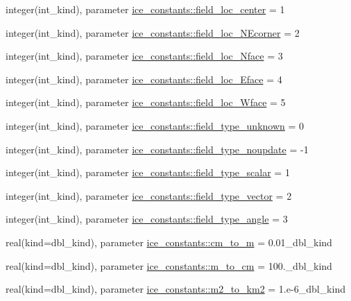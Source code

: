 \begin{DoxyCompactItemize}
\item 
integer(int\_\-kind), parameter \hyperlink{namespaceice__constants_a4c526a105da0fa08ad1877e55f6d60fc}{ice\_\-constants::field\_\-loc\_\-center} = 1
\item 
integer(int\_\-kind), parameter \hyperlink{namespaceice__constants_a6b38e42de787f72eabe064f976338775}{ice\_\-constants::field\_\-loc\_\-NEcorner} = 2
\item 
integer(int\_\-kind), parameter \hyperlink{namespaceice__constants_ac47ad33ed33a4dae49cf6e50c05efd06}{ice\_\-constants::field\_\-loc\_\-Nface} = 3
\item 
integer(int\_\-kind), parameter \hyperlink{namespaceice__constants_a542746cf70d3c18a41d44c5382c4cb34}{ice\_\-constants::field\_\-loc\_\-Eface} = 4
\item 
integer(int\_\-kind), parameter \hyperlink{namespaceice__constants_ad97a4cfce80f3acb3657f497e459e6fb}{ice\_\-constants::field\_\-loc\_\-Wface} = 5
\item 
integer(int\_\-kind), parameter \hyperlink{namespaceice__constants_ab690b4d66447609212d302c0fe485dda}{ice\_\-constants::field\_\-type\_\-unknown} = 0
\item 
integer(int\_\-kind), parameter \hyperlink{namespaceice__constants_a113ccc2c17076b3fce46d2a4d7f2b1c2}{ice\_\-constants::field\_\-type\_\-noupdate} = -\/1
\item 
integer(int\_\-kind), parameter \hyperlink{namespaceice__constants_a98992b4bfb499ea1f7a0f6037c17a100}{ice\_\-constants::field\_\-type\_\-scalar} = 1
\item 
integer(int\_\-kind), parameter \hyperlink{namespaceice__constants_abd07ef2bb17edc4fea6e1fc901ab89f8}{ice\_\-constants::field\_\-type\_\-vector} = 2
\item 
integer(int\_\-kind), parameter \hyperlink{namespaceice__constants_a3986aa54de6be9d32605fc28334dff02}{ice\_\-constants::field\_\-type\_\-angle} = 3
\item 
real(kind=dbl\_\-kind), parameter \hyperlink{namespaceice__constants_ae6404df4cdf687bafaf228da3b7b4354}{ice\_\-constants::cm\_\-to\_\-m} = 0.01\_\-dbl\_\-kind
\item 
real(kind=dbl\_\-kind), parameter \hyperlink{namespaceice__constants_a3f01424bceae75ecd2f26cdf208a89f6}{ice\_\-constants::m\_\-to\_\-cm} = 100.\_\-dbl\_\-kind
\item 
real(kind=dbl\_\-kind), parameter \hyperlink{namespaceice__constants_adea1a32826f6ac5693ff2cff66098aef}{ice\_\-constants::m2\_\-to\_\-km2} = 1.e-\/6\_\-dbl\_\-kind
\item 

\end{DoxyCompactItemize}
